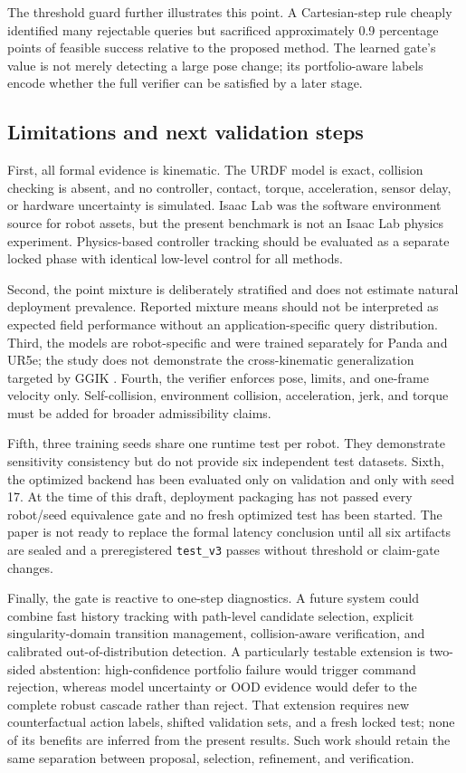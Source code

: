 \documentclass[10pt,a4paper]{article}
\begin{document}
The threshold guard further illustrates this point. A Cartesian-step rule cheaply
identified many rejectable queries but sacrificed approximately 0.9 percentage points
of feasible success relative to the proposed method. The learned gate's value is not
merely detecting a large pose change; its portfolio-aware labels encode whether the
full verifier can be satisfied by a later stage.

\subsection{Limitations and next validation steps}

First, all formal evidence is kinematic. The URDF model is exact, collision checking is
absent, and no controller, contact, torque, acceleration, sensor delay, or hardware
uncertainty is simulated. Isaac Lab was the software environment source for robot
assets, but the present benchmark is not an Isaac Lab physics experiment. Physics-based
controller tracking should be evaluated as a separate locked phase with identical
low-level control for all methods.

Second, the point mixture is deliberately stratified and does not estimate natural
deployment prevalence. Reported mixture means should not be interpreted as expected
field performance without an application-specific query distribution. Third, the
models are robot-specific and were trained separately for Panda and UR5e; the study
does not demonstrate the cross-kinematic generalization targeted by GGIK
\cite{limoyo2025ggik}. Fourth, the verifier enforces pose, limits, and one-frame
velocity only. Self-collision, environment collision, acceleration, jerk, and torque
must be added for broader admissibility claims.

Fifth, three training seeds share one runtime test per robot. They demonstrate
sensitivity consistency but do not provide six independent test datasets. Sixth, the
optimized backend has been evaluated only on validation and only with seed 17. At the
time of this draft, deployment packaging has not passed every robot/seed equivalence
gate and no fresh optimized test has been started. The paper is not ready to replace
the formal latency conclusion until all six artifacts are sealed and a preregistered
\texttt{test\_v3} passes without threshold or claim-gate changes.

Finally, the gate is reactive to one-step diagnostics. A future system could combine
fast history tracking with path-level candidate selection, explicit singularity-domain
transition management, collision-aware verification, and calibrated out-of-distribution
detection. A particularly testable extension is two-sided abstention: high-confidence
portfolio failure would trigger command rejection, whereas model uncertainty or OOD
evidence would defer to the complete robust cascade rather than reject. That extension
requires new counterfactual action labels, shifted validation sets, and a fresh locked
test; none of its benefits are inferred from the present results. Such work should
retain the same separation between proposal, selection, refinement, and verification.
\end{document}
